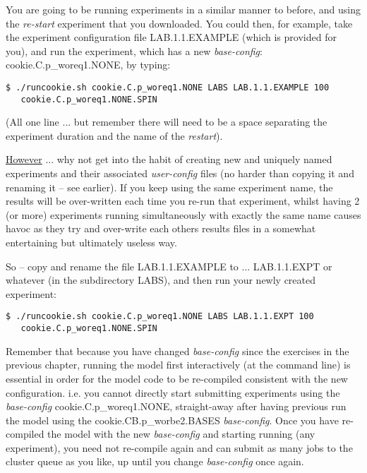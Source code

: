 \noindent You are going to be running experiments in a similar manner to before, and using the \textit{re-start} experiment that you downloaded. You could then, for example, take the experiment configuration file \textsf{\footnotesize LAB.1.1.EXAMPLE} (which is provided for you), and run the experiment, which has a new \textit{base-config}: \textsf{\footnotesize cookie.C.p\_woreq1.NONE}, by typing:
\vspace{-1mm}
\small\begin{verbatim}
$ ./runcookie.sh cookie.C.p_woreq1.NONE LABS LAB.1.1.EXAMPLE 100 
   cookie.C.p_woreq1.NONE.SPIN
\end{verbatim}\normalsize
(All one line ... but remember there will need to be a space separating the experiment duration and the name of the \textit{restart}).

\noindent \uline{However} ... why not get into the habit of creating new and uniquely named experiments and their associated \textit{user-config} files (no harder than copying it and renaming it -- see earlier). If you keep using the same experiment name, the results will be over-written each time you re-run that experiment, whilst having  2 (or more) experiments running simultaneously with exactly the same name causes havoc as they try and over-write each others results files in a somewhat entertaining but ultimately useless way. 

\vspace{1mm}
So -- copy and rename the file \textsf{\footnotesize LAB.1.1.EXAMPLE} to ... \textsf{\footnotesize LAB.1.1.EXPT} or whatever (in the subdirectory \textsf{\footnotesize LABS}), and then run your newly created experiment:
\vspace{-1mm}
\small\begin{verbatim}
$ ./runcookie.sh cookie.C.p_woreq1.NONE LABS LAB.1.1.EXPT 100 
   cookie.C.p_woreq1.NONE.SPIN
\end{verbatim}\normalsize

Remember that because you have changed \textit{base-config} since the exercises in the previous chapter, running the model first interactively (at the command line) is essential in order for the model code to be re-compiled consistent with the new configuration. i.e. you cannot directly start submitting experiments using the \textit{base-config} \textsf{\footnotesize cookie.C.p\_woreq1.NONE}, straight-away after having previous run the model using the \textsf{\footnotesize cookie.CB.p\_worbe2.BASES} \textit{base-config}. Once you have re-compiled the model with the new \textit{base-config} and starting running (any experiment), you need not re-compile again and can submit as many jobs to the cluster queue as you like, up until you change \textit{base-config} once again.

